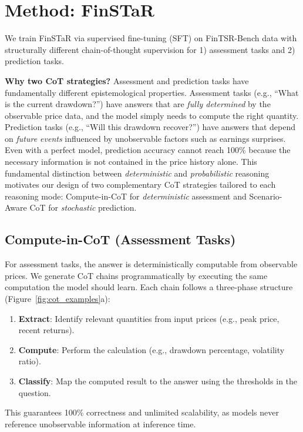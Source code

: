 \section{Method: FinSTaR}
\label{sec:method}

We train FinSTaR via supervised fine-tuning (SFT) on FinTSR-Bench data with structurally different chain-of-thought supervision for 1) assessment tasks and 2) prediction tasks.

\textbf{Why two CoT strategies?}
Assessment and prediction tasks have fundamentally different epistemological properties.
Assessment tasks (e.g., ``What is the current drawdown?'') have answers that are \textit{fully determined} by the observable price data, and the model simply needs to compute the right quantity.
Prediction tasks (e.g., ``Will this drawdown recover?'') have answers that depend on \textit{future events} influenced by unobservable factors such as earnings surprises.
Even with a perfect model, prediction accuracy cannot reach 100\% because the necessary information is not contained in the price history alone.
This fundamental distinction between \textit{deterministic} and \textit{probabilistic} reasoning motivates our design of two complementary CoT strategies tailored to each reasoning mode: Compute-in-CoT for \textit{deterministic} assessment and Scenario-Aware CoT for \textit{stochastic} prediction.

\subsection{Compute-in-CoT (Assessment Tasks)}

For assessment tasks, the answer is deterministically computable from observable prices. We generate CoT chains programmatically by executing the same computation the model should learn. Each chain follows a three-phase structure (Figure~\ref{fig:cot_examples}a):
\begin{enumerate}[leftmargin=1.8cm, labelsep=0.3cm]
\item[\textbf{Phase 1.}] \textbf{Extract}: Identify relevant quantities from input prices (e.g., peak price, recent returns).
\item[\textbf{Phase 2.}] \textbf{Compute}: Perform the calculation (e.g., drawdown percentage, volatility ratio).
\item[\textbf{Phase 3.}] \textbf{Classify}: Map the computed result to the answer using the thresholds in the question.
\end{enumerate}
This guarantees 100\% correctness and unlimited scalability, as models never reference unobservable information at inference time.


